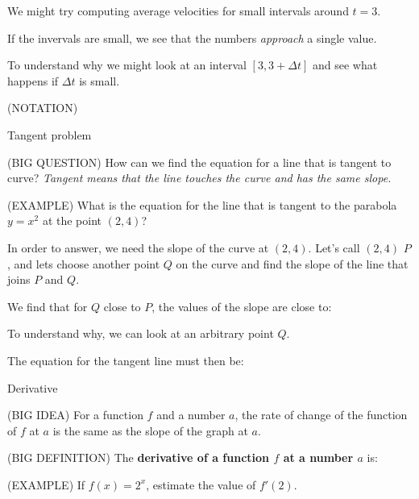 \documentclass[11pt]{article}
\begin{document}
We might try computing average velocities for small intervals around $t=3$.

\vspace{3.5in}


If the invervals are small, we see that the numbers \emph{approach} a single value.

\vspace{.5in}

To understand why we might look at an interval $[3, 3+ \Delta t]$ and see what happens if $\Delta t $ is small.

\vspace{2.5in}

(NOTATION)


\pagebreak


\begin{center}
\Large
\rm{Tangent problem}
\end{center}

(BIG QUESTION)  How can we find the equation for a line that is tangent to curve?  \emph{Tangent means that the line touches the curve and has the same slope.}

(EXAMPLE) What is the equation for the line that is tangent to the parabola $y=x^2$ at the point $(2,4)$? \\

\vspace{1.5in}

In order to answer, we need the slope of the curve at $(2,4)$.  Let's call $(2,4)$ $P$, and lets choose another point $Q$ on the curve and find the slope of the line that joins $P$ and $Q$.

\vspace{4.5in}

We find that for $Q$ close to $P$, the values of the slope are close to: 

\vspace{.5in}

\pagebreak

To understand why, we can look at an arbitrary point $Q$.

\vspace{1.5in}

The equation for the tangent line must then be:

\vspace{1in}

\begin{center}
\Large
\rm{Derivative}
\end{center}

(BIG IDEA) For a function $f$ and a number $a$, the rate of change of the function of $f$ at $a$ is the same as the slope of the graph at $a$.

\vspace{.25in}

(BIG DEFINITION) The {\bf derivative of a function $f$ at a number $a$} is:

\vspace{3.5in}

(EXAMPLE)  If $f(x) = 2^x$, estimate the value of $f'(2)$.
\end{document}
